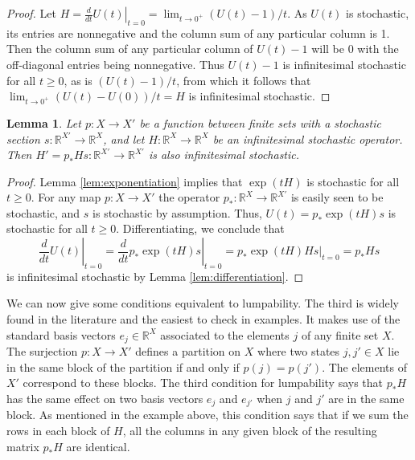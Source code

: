 \documentclass[oneside,final]{ucr}
\newtheorem{lemma}[theorem]{Lemma}
\theoremstyle{definition}
\newcommand{\maps}{\colon}
\newcommand{\R}{\mathbb{R}}
\begin{document}
{\begin{proof}
Let $H=\left. \frac{d}{dt} U(t) \right|_{t=0}  = \lim_{t \to 0^+} (U(t)-1)/t$. As $U(t)$ is stochastic, its entries are nonnegative and the column sum of any particular column is 1. Then the column sum of any particular column of $U(t)-1$ will be 0 with the off-diagonal entries being nonnegative. Thus $U(t)-1$ is infinitesimal stochastic for all $t \geq 0$, as is $(U(t)-1)/t$, from which it follows that $\lim_{t\to 0^+} (U(t)-U(0))/t = H$ is infinitesimal stochastic.
\end{proof}

\begin{lemma}
\label{lem:new_markov_process}
Let $p \maps X \to X'$ be a function between finite sets with a stochastic section $s \maps \R^{X'} \to \R^X$, and let $H \maps \R^X \to \R^X$ be an infinitesimal stochastic operator. Then $H' = p_* H s \maps \R^{X'} \to \R^{X'}$ is also infinitesimal stochastic.
\end{lemma}

\begin{proof}
Lemma \ref{lem:exponentiation} implies that $\exp(tH)$ is stochastic for all $t \ge 0$.    For any map $p \maps X \to X'$ the operator $p_* \maps \R^X \to \R^{X'}$ is easily seen to be stochastic, and $s$ is stochastic by assumption.  Thus, $U(t) = p_* \exp(tH) s$ is stochastic for all $t \ge 0$.    Differentiating, we conclude that 
\[   \left. \frac{d}{dt} U(t) \right|_{t=0}= \left. \frac{d}{dt} p_* \exp(tH) s \right|_{t=0} =
\left. p_* \exp(tH)H s \right|_{t=0} = p_* H s \] 
is infinitesimal stochastic by Lemma \ref{lem:differentiation}.
\end{proof}

We can now give some conditions equivalent to lumpability.   The third is widely found in the literature \cite{Buchholz} and the easiest to check in examples.   It makes use of  the standard basis vectors $e_j \in \R^X$ associated to the elements $j$ of any finite set $X$.    The surjection $p \maps X \to X'$ defines a partition on $X$ where two states $j,j' \in X$ lie in the same block of the partition if and only if $p(j) = p(j')$.   The elements of $X'$ correspond to these blocks.   The third condition for lumpability says that $p_* H$ has the same effect on two basis vectors $e_j$ and $e_{j'}$ when $j$ and $j'$ are in the same block.  As mentioned in the example above, this condition
says that if we sum the rows in each block of $H$, all the columns in any given block of the resulting matrix $p_* H$ are identical.

}
\end{document}
